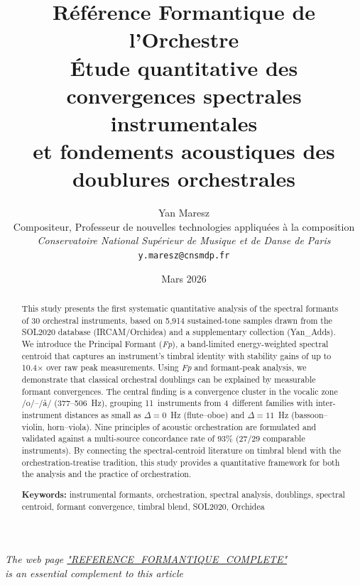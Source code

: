 \documentclass[12pt,a4paper]{article}
\title{%
  \textbf{Référence Formantique de l'Orchestre}\\[6pt]
  \large Étude quantitative des convergences spectrales instrumentales\\
  et fondements acoustiques des doublures orchestrales%
}
\author{%
  Yan Maresz\\
  Compositeur, Professeur de nouvelles technologies appliquées à la composition\\
  \textit{Conservatoire National Supérieur de Musique et de Danse de Paris}\\
  \texttt{y.maresz@cnsmdp.fr}%
}
\date{Mars 2026}
\begin{document}
\maketitle

\begin{center}
\small
\textit{The web page
\href{https://zseramnay.github.io/Orchestration/Etude-Formants/Versions-html-and-docx/REFERENCE_FORMANTIQUE_COMPLETE.html}{"REFERENCE\_FORMANTIQUE\_COMPLETE"} \\
is an essential complement to this article}
\end{center}
\vspace{1cm}


\begin{abstract}
This study presents the first systematic quantitative analysis of the spectral
formants of 30 orchestral instruments, based on 5,914 sustained-tone samples
drawn from the SOL2020 database (IRCAM/Orchidea) and a supplementary
collection (Yan\_Adds). We introduce the Principal Formant (\textit{Fp}), a
band-limited energy-weighted spectral centroid that captures an instrument's
timbral identity with stability gains of up to 10.4$\times$ over raw peak
measurements. Using \textit{Fp} and formant-peak analysis, we demonstrate that
classical orchestral doublings can be explained by measurable formant
convergences. The central finding is a convergence cluster in the vocalic zone
/o/--/\aa/ (377--506~Hz), grouping 11~instruments from 4~different families
with inter-instrument distances as small as $\Delta = 0$~Hz (flute--oboe) and
$\Delta = 11$~Hz (bassoon--violin, horn--viola). Nine principles of acoustic
orchestration are formulated and validated against a multi-source concordance
rate of 93\% (27/29 comparable instruments). By connecting the spectral-centroid
literature on timbral blend \citep{Sandell1995,Tardieu2012,Goodchild2018} with
the orchestration-treatise tradition, this study provides a quantitative
framework for both the analysis and the practice of orchestration.

\medskip
\noindent\textbf{Keywords:} instrumental formants, orchestration, spectral analysis,
doublings, spectral centroid, formant convergence, timbral blend, SOL2020, Orchidea
\end{abstract}

\end{document}
